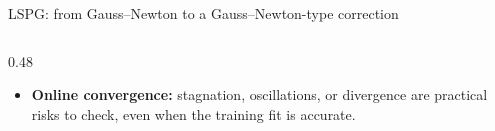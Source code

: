 \documentclass[aspectratio=169]{beamer}
\begin{document}
\begin{frame}{LSPG: from Gauss--Newton to a Gauss--Newton-type correction}
\begin{columns}[T,onlytextwidth]
\begin{column}{0.48\textwidth}
{{\begin{itemize}
\item \textbf{Online convergence:} stagnation, oscillations, or divergence are practical risks to check, even when the training fit is accurate.
\end{itemize}}}
\end{column}
\end{columns}
\vspace{0pt}
\par
{\fontsize{8}{9}\selectfont
{}
\hfill{}}
\end{frame}
\end{document}
